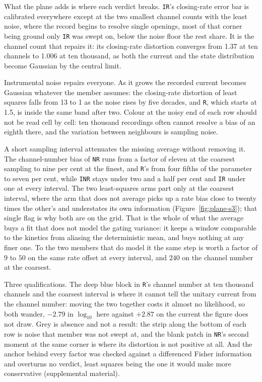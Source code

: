 What the plane adds is where each verdict breaks. \texttt{IR}'s closing-rate error bar is calibrated
everywhere except at the two smallest channel counts with the least noise, where the record begins to resolve single openings, most of that corner being
ground only \texttt{IR} was swept on, below the noise floor the rest share. It is the channel count
that repairs it: its closing-rate distortion converges from 1.37 at ten channels to 1.006 at ten
thousand, as both the current and the state distribution become Gaussian by the central limit.

Instrumental noise repairs everyone. As it grows the recorded current becomes Gaussian whatever the
member assumes: the closing-rate distortion of least squares falls from 13 to 1 as the noise rises
by five decades, and \texttt{R}, which starts at 1.5, is inside the same band after two. Colour at
the noisy end of each row should not be read cell by cell: ten thousand recordings often cannot
resolve a bias of an eighth there, and the variation between neighbours is sampling noise.

A short sampling interval attenuates the missing average without removing it. The channel-number
bias of \texttt{NR} runs from a factor of eleven at the coarsest sampling to nine per cent at the
finest, and \texttt{R}'s from four fifths of the parameter to seven per cent, while \texttt{INR}
stays under two and a half per cent and \texttt{IR} under one at every interval. The two
least-squares arms part only at the coarsest interval, where the arm that does not average picks up
a rate bias close to twenty times the other's and understates its own information
(Figure~\ref{fig:plane-s3}); that single flag is why both are on the grid.
That is the whole of what the average buys a fit that does not model the gating variance: it keeps
a window comparable to the kinetics from aliasing the deterministic mean, and buys nothing at any
finer one. To the two members that do model it the same step is worth a factor of $9$ to $50$ on
the same rate offset at every interval, and $240$ on the channel number at the coarsest.

Three qualifications. The deep blue block in \texttt{R}'s channel number at ten thousand channels
and the coarsest interval is where it cannot tell the unitary current from the channel number:
moving the two together costs it almost no likelihood, so both wander, $-2.79$ in $\log_{10}$ here
against $+2.87$ on the current the figure does not draw. Grey is absence and not a result: the strip
along the bottom of each row is noise that member was not swept at, and the blank patch in
\texttt{NR}'s second moment at the same corner is where its distortion is not positive at all. And
the anchor behind every factor was checked against a differenced Fisher information and overturns no
verdict, least squares being the one it would make more conservative (supplemental material).

